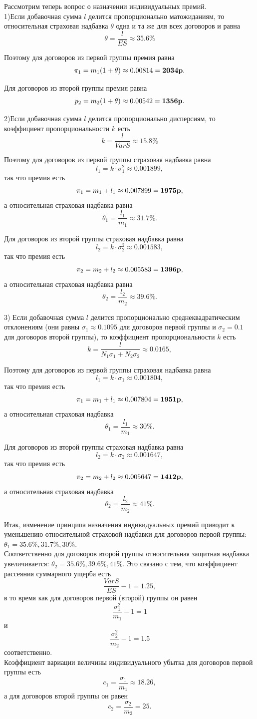 \documentclass[12pt,a4paper]{article}
\begin{document}
Рассмотрим теперь вопрос о назначении индивидуальных премий.\\
1)Если добавочная сумма $l$ делится пропорционально матожиданиям, то относительная страховая надбавка $\theta$ 
одна и та же для всех договоров и равна $$\theta = \frac{l}{ES} \approx 35.6\%$$

Поэтому для договоров из первой группы премия равна
$$\pi_1 = m_1(1+\theta) \approx 0.00814 = \bf 2034 p.$$

Для договоров из второй группы премия равна
$$p_2=m_2(1+\theta) \approx 0.00542 = \bf 1356 p.$$

2)Если добавочная сумма $l$ делится пропорционально дисперсиям, то коэффициент пропорциональности $k$ есть
$$k = \frac{l}{VarS} \approx 15.8\%$$

Поэтому для договоров из первой группы страховая надбавка равна 
$$l_1 = k\cdot \sigma_1^2 \approx 0.001899,$$
так что премия есть
$$\pi_1 = m_1 + l_1 \approx 0.007899 = \bf1975p,$$
а относительная страховая надбавка равна
$$\theta_1 = \frac{l_1}{m_1}  \approx 31.7\%.$$

Для договоров из второй группы страховая надбавка равна 
$$l_2 = k\cdot \sigma_2^2 \approx  0.001583,$$
так что премия есть
$$\pi_2 = m_2 + l_2 \approx 0.005583 = \bf 1396p,$$
а относительная страховая надбавка равна
$$\theta_2 = \frac{l_2}{m_2}  \approx 39.6\%.$$

3) Если добавочная сумма $l$ делится пропорционально среднеквадратическим отклонениям (они равны $\sigma_1 \approx 0.1095$ для договоров первой группы и $\sigma_2 = 0.1$ для договоров второй группы), то коэффициент пропорциональности $k$ есть
$$k = \frac{l}{N_1\sigma_1 + N_2\sigma_2} \approx 0.0165,$$

Поэтому для договоров из первой группы страховая надбавка равна 
$$l_1=k\cdot \sigma_1 \approx 0.001804,$$
так что премия есть 
$$\pi_1 = m_1 + l_1 \approx 0.007804 = \bf 1951p,$$
а относительная страховая надбавка 
$$\theta_1 = \frac{l_1}{m_1}  \approx 30\%.$$

Для договоров из второй группы страховая надбавка равна 
$$l_2=k\cdot \sigma_2 \approx 0.001647,$$
так что премия есть 
$$\pi_2 = m_2 + l_2 \approx 0.005647 = \bf 1412p,$$
а относительная страховая надбавка 
$$\theta_2 = \frac{l_2}{m_2}  \approx 41\%.$$

Итак, изменение принципа назначения индивидуальных премий приводит к уменьшению относительной страховой надбавки для договоров первой группы: 
$\theta_1 = 35.6\%,31.7\%,30\%.$\\
Соответственно для договоров второй группы относительная защитная надбавка увеличивается: 
$\theta_2 = 35.6\%,39.6\%,41\%.$ Это связано с тем, что коэффициент рассеяния суммарного ущерба есть
$$ \frac{VarS}{ES} -1 =1.25,$$
в то время как для договоров первой (второй) группы он равен 
$$\frac{\sigma_1^2}{m_1} - 1= 1$$ и  
$$\frac{\sigma_2^2}{m_2} - 1= 1.5$$ соответственно.\\
Коэффициент вариации величины индивидуального убытка для договоров первой группы есть 
$$c_1 = \frac{\sigma_1}{m_1} \approx 18.26,$$
а для договоров второй группы он равен
$$c_2 = \frac{\sigma_2}{m_2} =25.$$
\end{document}
